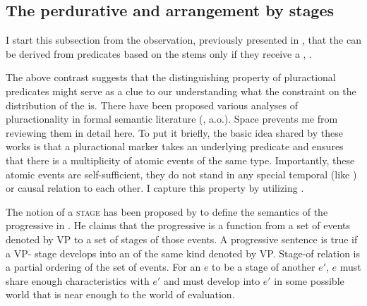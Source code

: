 \documentclass[output=paper,colorlinks,citecolor=brown,newtxmath]{langsci/langscibook}
\begin{document}
\subsection{The perdurative and arrangement by stages} \label{sec:naumov:3.5}

I start this subsection from the observation, previously presented in , that the  can be derived from predicates based on the   stems only if they receive a , .

\z

\noindent The above contrast suggests that the distinguishing property of pluractional predicates might serve as a clue to our understanding what the constraint on the distribution of the  is. There have been proposed various analyses of  pluractionality in formal semantic literature (\citealt{lasersohn1995plurality,van2004adverbials,tovena2010pluractionality,henderson2012ways}, a.o.). Space prevents me from reviewing them in detail here. To put it briefly, the basic idea shared by these works is that a pluractional marker takes an underlying predicate and ensures that there is a multiplicity of atomic events of the same type. Importantly, these atomic events are self-sufficient, they do not stand in any special temporal (like ) or causal relation to each other. I capture this property by utilizing  .

The notion of a \textsc{stage} has been proposed by \citet{landman1992progressive} to define the semantics of the progressive in . He claims that the progressive is a function from a set of events denoted by VP to a set of stages of those events. A progressive sentence is true if a VP- stage develops into an  of the same kind denoted by VP. Stage-of relation is a partial ordering of the set of events. For an  $e$ to be a stage of another  $e′$, $e$ must share enough characteristics with $e′$ and must develop into $e′$ in some possible world that is near enough to the world of evaluation.
\end{document}
